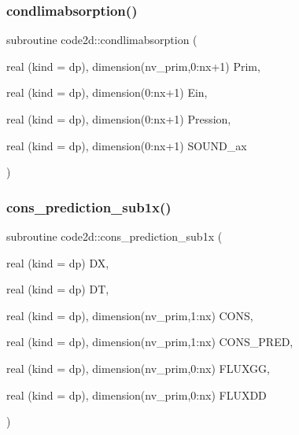 \subsubsection{\texorpdfstring{condlimabsorption()}{condlimabsorption()}}
{\footnotesize\ttfamily subroutine code2d\+::condlimabsorption (\begin{DoxyParamCaption}\item[{real (kind = dp), dimension(nv\+\_\+prim,0\+:nx+1)}]{Prim,  }\item[{real (kind = dp), dimension(0\+:nx+1)}]{Ein,  }\item[{real (kind = dp), dimension(0\+:nx+1)}]{Pression,  }\item[{real (kind = dp), dimension(0\+:nx+1)}]{S\+O\+U\+N\+D\+\_\+ax }\end{DoxyParamCaption})}

\mbox{\label{main1DOr2_8f90_a41f5497b85eecbbc6af40d3959e67a3d}} 
\subsubsection{\texorpdfstring{cons\+\_\+prediction\+\_\+sub1x()}{cons\_prediction\_sub1x()}}
{\footnotesize\ttfamily subroutine code2d\+::cons\+\_\+prediction\+\_\+sub1x (\begin{DoxyParamCaption}\item[{real (kind = dp)}]{DX,  }\item[{real (kind = dp)}]{DT,  }\item[{real (kind = dp), dimension(nv\+\_\+prim,1\+:nx)}]{C\+O\+NS,  }\item[{real (kind = dp), dimension(nv\+\_\+prim,1\+:nx)}]{C\+O\+N\+S\+\_\+\+P\+R\+ED,  }\item[{real (kind = dp), dimension(nv\+\_\+prim,0\+:nx)}]{F\+L\+U\+X\+GG,  }\item[{real (kind = dp), dimension(nv\+\_\+prim,0\+:nx)}]{F\+L\+U\+X\+DD }\end{DoxyParamCaption})}

\mbox{\label{main1DOr2_8f90_a47ac97fd58c2f9695ffff2ee98d498c1}} 
